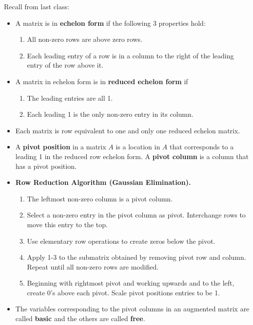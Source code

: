 \documentclass[12pt,letterpaper]{article}
\begin{document}
\thispagestyle{fancy}

Recall from last class:

\begin{itemize}

\item A matrix is in {\bf echelon form} if the following 3 properties hold:
\begin{enumerate}
\item All non-zero rows are above zero rows.
\item Each leading entry of a row is in a column to the right of the leading entry of the row above it.
\end{enumerate}
\item A matrix in echelon form is in {\bf reduced echelon form} if 
\begin{enumerate}
\item The leading entries are all 1.
\item Each leading 1 is the only non-zero entry in its column.
\end{enumerate}
\item Each matrix is row equivalent to one and only one reduced echelon matrix.
\item A {\bf pivot position} in a matrix $A$ is a location in $A$ that corresponds to a leading 1 in the reduced row echelon form. A {\bf pivot column} is a column that has a pivot position. 
\item {\bf Row Reduction Algorithm (Gaussian Elimination).}
\begin{enumerate}
\item The leftmost non-zero column is a pivot column.
\item Select a non-zero entry in the pivot column as pivot. Interchange rows to move this entry to the top.
\item Use elementary row operations to create zeros below the pivot.
\item Apply 1-3 to the submatrix obtained by removing pivot row and column. Repeat until all non-zero rows are modified.
\item Beginning with rightmost pivot and working upwards and to the left, create 0's above each pivot. Scale pivot positions entries to be 1.
\end{enumerate}
\item The variables corresponding to the pivot columns in an augmented matrix are called {\bf basic} and the others are called {\bf free}.

\end{itemize}
\end{document}
